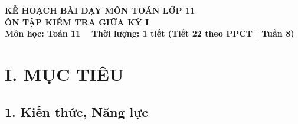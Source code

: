 \documentclass[12pt, a4paper]{article}
\begin{document}
\begin{center}
    {\fontsize{14pt}{17pt}\selectfont \textbf{KẾ HOẠCH BÀI DẠY MÔN TOÁN LỚP 11}}\\[6pt]
    {\fontsize{16pt}{19pt}\selectfont \textbf{ÔN TẬP KIỂM TRA GIỮA KỲ I}}\\[4pt]
    {\fontsize{12pt}{15pt}\selectfont \textbf{Môn học: Toán 11} \ \textbar \ \textbf{Thời lượng: 1 tiết (Tiết 22 theo PPCT | Tuần 8)}}
\end{center}

\vspace{5pt}

\section*{I. MỤC TIÊU}

\subsection*{1. Kiến thức, Năng lực}
\end{document}
